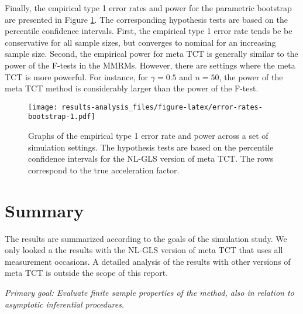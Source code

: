 \documentclass[
]{article}
\begin{document}
Finally, the empirical type 1 error rates and power for the parametric bootstrap
are presented in Figure \ref{fig:error-rates-bootstrap}. The corresponding
hypothesis tests are based on the percentile confidence intervals. First, the
empirical type 1 error rate tends be be conservative for all sample sizes, but
converges to nominal for an increasing sample size. Second, the empirical power
for meta TCT is generally similar to the power of the F-tests in the MMRMs. However,
there are settings where the meta TCT is more powerful. For instance, for
\(\gamma = 0.5\) and \(n = 50\), the power of the meta TCT method is considerably
larger than the power of the F-test.

\begin{figure}
\centering
\texttt{[image: results-analysis\_files/figure-latex/error-rates-bootstrap-1.pdf]}
\caption{\label{fig:error-rates-bootstrap}Graphs of the empirical type 1 error rate and power across a set of simulation settings. The hypothesis tests are based on the percentile confidence intervals for the NL-GLS version of meta TCT. The rows correspond to the true acceleration factor.}
\end{figure}

\hypertarget{summary}{%
\section{Summary}\label{summary}}

The results are summarized according to the goals of the simulation study. We
only looked a the results with the NL-GLS version of meta TCT that uses all
measurement occasions. A detailed analysis of the results with other versions
of meta TCT is outside the scope of this report.

\emph{Primary goal: Evaluate finite sample properties of the method, also in relation
to asymptotic inferential procedures.}
\end{document}
